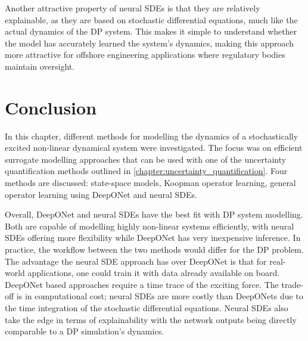 Another attractive property of neural SDEs is that they are relatively explainable, as they are based on stochastic
differential equations, much like the actual dynamics of the DP system. This makes it simple to understand whether the
model has accurately learned the system's dynamics, making this approach more attractive for offshore engineering
applications where regulatory bodies maintain oversight. 

\section{Conclusion}
\label{sec:conclusion}
In this chapter, different methods for modelling the dynamics of a stochastically excited non-linear dynamical system
were investigated. The focus was on efficient surrogate modelling approaches that can be used with one of the
uncertainty quantification methods outlined in \cref{chapter:uncertainty_quantification}. Four methods are discussed:
state-space models, Koopman operator learning, general operator learning using DeepONet and neural SDEs.

Overall, DeepONet and neural SDEs have the best fit with DP system modelling. Both are capable of modelling highly
non-linear systems efficiently, with neural SDEs offering more flexibility while DeepONet has very inexpensive
inference. In practice, the workflow between the two methods would differ for the DP problem. The advantage the neural
SDE approach has over DeepONet is that for real-world applications, one could train it with data already available on
board. DeepONet based approaches require a time trace of the exciting force. The trade-off is in computational cost;
neural SDEs are more costly than DeepONets due to the time integration of the stochastic differential equations. Neural
SDEs also take the edge in terms of explainability with the network outputs being directly comparable to a DP
simulation's dynamics. 